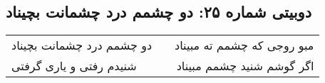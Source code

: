 \begin{center}
\section*{دوبیتی شماره ۲۵: دو چشمم درد چشمانت بچیناد}
\label{sec:025}
\begin{longtable}{l p{0.5cm} r}
دو چشمم درد چشمانت بچیناد
&&
مبو روجی که چشمم ته مبیناد
\\
شنیدم رفتی و یاری گرفتی
&&
اگر گوشم شنید چشمم مبیناد
\\
\end{longtable}
\end{center}
